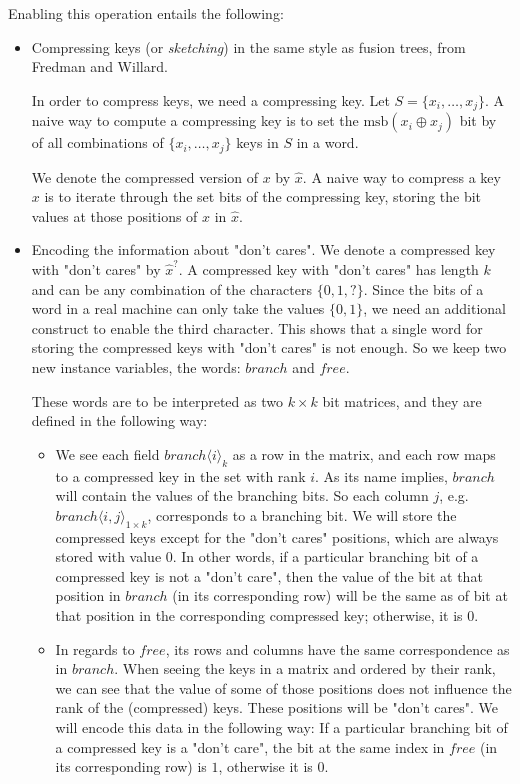 Enabling this operation entails the following:
\begin{itemize}
    \item
    Compressing keys (or \textit{sketching}) in the same style as fusion trees, from Fredman and Willard.
    
    In order to compress keys, we need a compressing key. Let $S = \{x_i, \dots, x_j\}$. A naive way to compute a compressing key is to set the $\text{msb}(x_i \oplus x_j)$ bit by of all combinations of $\{x_i, \dots, x_j\}$ keys in $S$ in a word.
    
    We denote the compressed version of $x$ by $\hat x $. A naive way to compress a key $x$ is to iterate through the set bits of the compressing key, storing the bit values at those positions of $x$ in $\hat x$.
    
    \item
    Encoding the information about "don't cares". We denote a compressed key with "don't cares" by $\hat x^?$. A compressed key with "don't cares" has length $k$ and can be any combination of the characters $\{0, 1, ?\}$. Since the bits of a word in a real machine can only take the values $\{0, 1\}$, we need an additional construct to enable the third character. This shows that a single word for storing the compressed keys with "don't cares" is not enough. So we keep two new instance variables, the words: $branch$ and $free$.
    
    These words are to be interpreted as two $k \times k$ bit matrices, and they are defined in the following way:
    \begin{itemize}
        \item
        We see each field $branch\langle i \rangle_k$ as a row in the matrix, and each row maps to a compressed key in the set with rank $i$.
        As its name implies, $branch$ will contain the values of the branching bits. 
        So each column $j$, e.g. $branch\langle i, j\rangle_{1 \times k}$, corresponds to a branching bit.
        We will store the compressed keys except for the "don't cares" positions, which are always stored with value $0$.
        In other words, if a particular branching bit of a compressed key is not a "don't care", then the value of the bit at that position in $branch$ (in its corresponding row) will be the same as of bit at that position in the corresponding compressed key; otherwise, it is 0.
        
        \item
        In regards to $free$, its rows and columns have the same correspondence as in $branch$.
        When seeing the keys in a matrix and ordered by their rank, we can see that the value of some of those positions does not influence the rank of the (compressed) keys.
        These positions will be "don't cares".
        We will encode this data in the following way: If a particular branching bit of a compressed key is a "don't care", the bit at the same index in $free$ (in its corresponding row) is $1$, otherwise it is $0$.
    \end{itemize}


\end{itemize}
